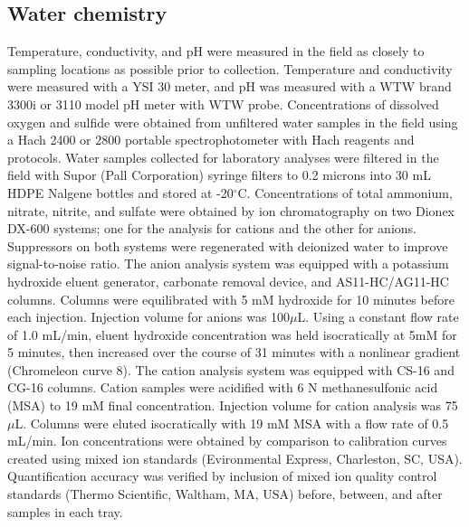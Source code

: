 \subsection{Water chemistry} Temperature, conductivity, and pH were measured in the field as closely to sampling locations as possible prior to collection. Temperature and conductivity were measured with a YSI 30 meter, and pH was measured with a WTW brand 3300i or 3110 model pH meter with WTW probe. Concentrations of dissolved oxygen and sulfide were obtained from unfiltered water samples in the field using a Hach 2400 or 2800 portable spectrophotometer with Hach reagents and protocols. Water samples collected for laboratory analyses were filtered in the field with Supor (Pall Corporation) syringe filters to 0.2 microns into 30 mL HDPE Nalgene bottles and stored at -20$^{\circ}$C. Concentrations of total ammonium, nitrate, nitrite, and sulfate were obtained by ion chromatography on two Dionex DX-600 systems; one for the analysis for cations and the other for anions. Suppressors on both systems were regenerated with deionized water to improve signal-to-noise ratio. The anion analysis system was equipped with a potassium hydroxide eluent generator, carbonate removal device, and AS11-HC/AG11-HC columns. Columns were equilibrated with 5 mM hydroxide for 10 minutes before each injection. Injection volume for anions was 100$\mu$L. Using a constant flow rate of 1.0 mL/min, eluent hydroxide concentration was held isocratically at 5mM for 5 minutes, then increased over the course of 31 minutes with a nonlinear gradient (Chromeleon curve 8). The cation analysis system was equipped with CS-16 and CG-16 columns. Cation samples were acidified with 6 N methanesulfonic acid (MSA) to 19 mM final concentration. Injection volume for cation analysis was 75$\mu$L. Columns were eluted isocratically with 19 mM MSA with a flow rate of 0.5 mL/min. Ion concentrations were obtained by comparison to calibration curves created using mixed ion standards (Evironmental Express, Charleston, SC, USA). Quantification accuracy was verified by inclusion of mixed ion quality control standards (Thermo Scientific, Waltham, MA, USA) before, between, and after samples in each tray.

